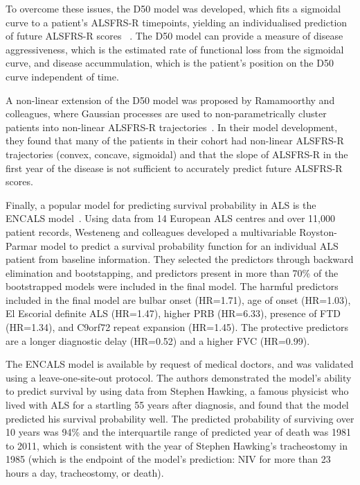 To overcome these issues, the D50 model was developed, which fits a sigmoidal curve to a patient's ALSFRS-R timepoints, yielding an individualised prediction of future ALSFRS-R scores
~\cite{poesenNeurofilamentMarkersALS2017, steinbachApplyingD50Disease2020}.
The D50 model can provide a measure of disease aggressiveness, which is the estimated rate of functional loss from the sigmoidal curve, and disease accummulation, which is the patient's position on the D50 curve independent of time.

A non-linear extension of the D50 model was proposed by Ramamoorthy and colleagues, where Gaussian processes are used to non-parametrically cluster patients into non-linear ALSFRS-R trajectories~\cite{ramamoorthyIdentifyingPatternsAmyotrophic2022}.
In their model development, they found that many of the patients in their cohort had non-linear ALSFRS-R trajectories (convex, concave, sigmoidal) and that the slope of ALSFRS-R in the first year of the disease is not sufficient to accurately predict future ALSFRS-R scores.

Finally, a popular model for predicting survival probability in ALS is the ENCALS model~\cite{westenengPrognosisPatientsAmyotrophic2018}.
Using data from 14 European ALS centres and over 11,000 patient records, Westeneng and colleagues developed a multivariable Royston-Parmar model to predict a survival probability function for an individual ALS patient from baseline information.
They selected the predictors through backward elimination and bootstapping, and predictors present in more than 70\% of the bootstrapped models were included in the final model.
The harmful predictors included in the final model are bulbar onset (HR=1.71), age of onset (HR=1.03), El Escorial definite ALS (HR=1.47), higher PRB (HR=6.33), presence of FTD (HR=1.34), and C9orf72 repeat expansion (HR=1.45).
The protective predictors are a longer diagnostic delay (HR=0.52) and a higher FVC (HR=0.99).

The ENCALS model is available by request of medical doctors, and was validated using a leave-one-site-out protocol.
The authors demonstrated the model's ability to predict survival by using data from Stephen Hawking, a famous physicist who lived with ALS for a startling 55 years after diagnosis, and found that the model predicted his survival probability well.
The predicted probability of surviving over 10 years was 94\% and the interquartile range of predicted year of death was 1981 to 2011, which is consistent with the year of Stephen Hawking's tracheostomy in 1985 (which is the endpoint of the model's prediction: NIV for more than 23 hours a day, tracheostomy, or death).


